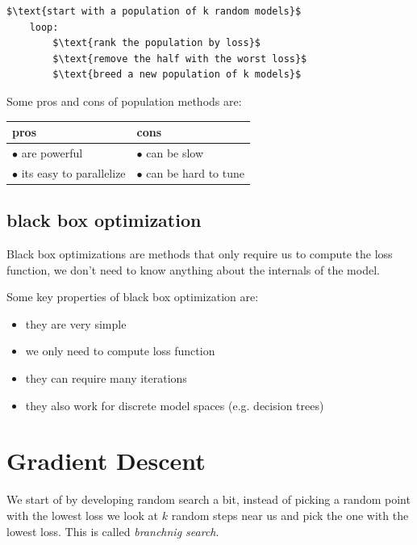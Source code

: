\documentclass[12pt]{article}
\begin{document}
\begin{lstlisting}[caption=evolutionary algorithms]
    $\text{start with a population of k random models}$
    loop:
        $\text{rank the population by loss}$
        $\text{remove the half with the worst loss}$
        $\text{breed a new population of k models}$
\end{lstlisting}

Some pros and cons of population methods are:

\begin{center}
    \begin{tabular}{|l|l|}
        \hline
        pros & cons \\
        \hline
        $\bullet$ are powerful & $\bullet$ can be slow \\
        $\bullet$ its easy to parallelize & $\bullet$ can be hard to tune \\
        \hline
    \end{tabular}
\end{center}

\subsection{black box optimization}

\begin{definition}
    Black box optimizations are methods that only require us to compute the loss function, we don't need to know anything about the internals of the model.
\end{definition}

Some key properties of black box optimization are:
\begin{itemize}[leftmargin=*, noitemsep]
    \item they are very simple 
    \item we only need to compute loss function 
    \item they can require many iterations 
    \item they also work for discrete model spaces (e.g. decision trees)
\end{itemize}

\newpage

\section{Gradient Descent}

We start of by developing random search a bit, instead of picking a random point with the lowest loss we look at $k$ random steps near us and pick the one with the lowest loss. This is called \textit{branchnig search}.
\end{document}

